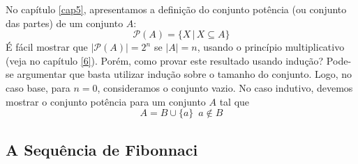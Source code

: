 No capítulo \ref{cap5}, apresentamos a definição do conjunto potência
(ou conjunto das partes) de um conjunto $A$:
\[\mathcal{P}(A) =\{X\,|\,X\subseteq A\}\]
É fácil mostrar que $|\mathcal{P}(A)| = 2^n$ se $|A| = n$, usando o
princípio multiplicativo (veja no capítulo \ref{6}). Porém, como
provar este resultado usando indução? Pode-se argumentar que basta
utilizar indução sobre o tamanho do conjunto. Logo, no caso base, para
$n = 0$, consideramos o conjunto vazio. No caso indutivo, devemos
mostrar o conjunto potência para um conjunto $A$ tal que
\[
A = B \cup \{a\}\,\,\,a\not\in B
\]



\subsection{A Sequência de Fibonnaci}